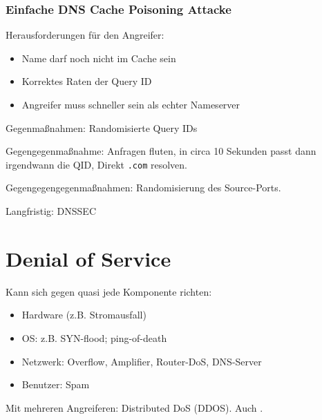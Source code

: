 \subsubsection{Einfache DNS Cache Poisoning Attacke}
Herausforderungen für den Angreifer:
\begin{itemize}
    \item Name darf noch nicht im Cache sein
    \item Korrektes Raten der Query ID
    \item Angreifer muss schneller sein als echter Nameserver
\end{itemize}

Gegenmaßnahmen: Randomisierte Query IDs

\vspace{.3cm}

Gegengegenmaßnahme: Anfragen fluten, in circa 10 Sekunden passt dann irgendwann die QID,
Direkt \lstinline{.com} resolven.

\vspace{.3cm}

Gegengegengegenmaßnahmen: Randomisierung des Source-Ports.

\vspace{.3cm}

Langfristig: DNSSEC

\section{Denial of Service}
Kann sich gegen quasi jede Komponente richten:
\begin{itemize}
    \item Hardware (z.B. Stromausfall)
    \item OS: z.B. SYN-flood; ping-of-death
    \item Netzwerk: Overflow, Amplifier, Router-DoS, DNS-Server
    \item Benutzer: Spam
\end{itemize}

Mit mehreren Angreiferen: Distributed DoS (DDOS). Auch .

